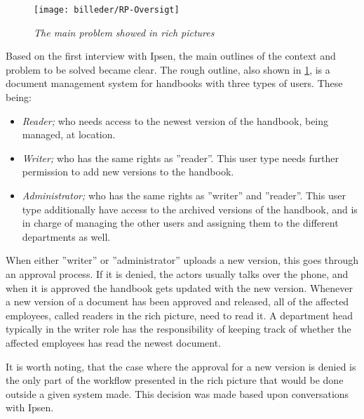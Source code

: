 \begin{figure}[H]
	\centering
	\texttt{[image: billeder/RP-Oversigt]}
	\caption{\textit{The main problem showed in rich pictures
	}}
	\label{fig:RP-Oversigt}
\end{figure}

Based on the first interview with Ipsen, the main outlines of the context and problem to be solved became clear.
The rough outline, also shown in \cref{fig:RP-Oversigt}, is a document management system for handbooks with three types of users. 
These being:
\begin{itemize}
	\item
		\textit{Reader;} who needs access to the newest version of the handbook, being managed, at location.
	\item
		\textit{Writer;} who has the same rights as ''reader''.
		This user type needs further permission to add new versions to the handbook.
	\item
		\textit{Administrator;} who has the same rights as ''writer'' and ''reader''.
		This user type additionally have access to the archived versions of the handbook, and is in charge of managing the other users and assigning them to the different departments as well.
\end{itemize}

When either ''writer'' or ''administrator'' uploads a new version, this goes through an approval process.
If it is denied, the actors usually talks over the phone, and when it is approved the handbook gets updated with the new version.
Whenever a new version of a document has been approved and released, all of the affected employees, called readers in the rich picture, need to read it.
A department head typically in the writer role has the responsibility of keeping track of whether the affected employees has read the newest document.

It is worth noting, that the case where the approval for a new version is denied is the only part of the workflow presented in the rich picture that would be done outside a given system made.
This decision was made based upon conversations with Ipsen.

